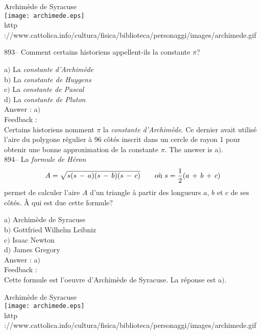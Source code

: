 ﻿\documentclass[letterpaper, 12pt]{article}
\begin{document}
        \begin{center}
        Archim\`ede de Syracuse\\
    \texttt{[image: archimede.eps]}\\
        {\footnotesize http
://www.cattolica.info/cultura/fisica/biblioteca/personaggi/images/archimede.gif}
    \end{center}

893-- Comment certains historiens appellent-ils la constante $\pi$?

a$)$ La {\sl constante d'Archim\`ede} \\
b$)$ La {\sl constante de Huygens} \\
c$)$ La {\sl constante de Pascal} \\
d$)$ La {\sl constante de Pluton} \\

Answer : a$)$\\

Feedback : \\
Certains historiens nomment $\pi$ la {\sl constante d'Archim\`ede}.
Ce dernier avait utilis\'e l'aire du polygone r\'egulier
\`a 96 c\^ot\'es inscrit dans un cercle de rayon 1 pour obtenir une bonne
approximation de la constante $\pi$. The answer is a$)$.\\

894-- La {\sl formule de H\'eron}
$$A=\sqrt{s(s\,-\,a)(s\,-\,b)(s\,-\,c)}\hskip 20 pt \text{o\`u }
s=\displaystyle\frac12(a\,+\,b\,+\,c)$$
permet de calculer l'aire $A$ d'un triangle \`a partir des longueurs
$a$, $b$ et $c$ de ses c\^ot\'es. \`A qui est due cette formule?

a$)$ Archim\`ede de Syracuse \\
b$)$ Gottfried Wilhelm Leibniz \\
c$)$ Isaac Newton \\
d$)$ James Gregory \\

Answer : a$)$\\

Feedback : \\
Cette formule est l'oeuvre d'Archim\`ede de Syracuse. La r\'eponse
est a$)$.

        \begin{center}
        Archim\`ede de Syracuse\\
    \texttt{[image: archimede.eps]}\\
        {\footnotesize http
://www.cattolica.info/cultura/fisica/biblioteca/personaggi/images/archimede.gif}
    \end{center}
\end{document}
